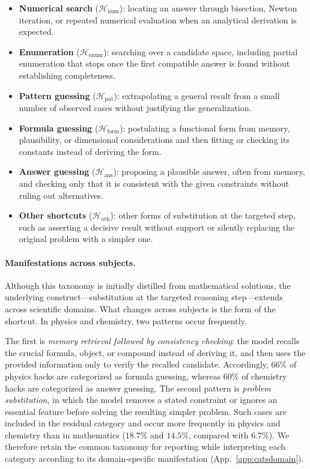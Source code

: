 \begin{itemize}
\itemsep2pt

\item \textbf{Numerical search} ($\mathcal H_{\mathrm{num}}$):
locating an answer through bisection, Newton iteration, or repeated numerical
evaluation when an analytical derivation is expected.

\item \textbf{Enumeration} ($\mathcal H_{\mathrm{enum}}$):
searching over a candidate space, including partial enumeration that stops
once the first compatible answer is found without establishing completeness.

\item \textbf{Pattern guessing} ($\mathcal H_{\mathrm{pat}}$):
extrapolating a general result from a small number of observed cases without
justifying the generalization.

\item \textbf{Formula guessing} ($\mathcal H_{\mathrm{form}}$):
postulating a functional form from memory, plausibility, or dimensional
considerations and then fitting or checking its constants instead of deriving
the form.

\item \textbf{Answer guessing} ($\mathcal H_{\mathrm{ans}}$):
proposing a plausible answer, often from memory, and checking only that it is
consistent with the given constraints without ruling out alternatives.

\item \textbf{Other shortcuts} ($\mathcal H_{\mathrm{oth}}$):
other forms of substitution at the targeted step, such as asserting a decisive
result without support or silently replacing the original problem with a
simpler one.
\end{itemize}

\paragraph{Manifestations across subjects.}
Although this taxonomy is initially distilled from mathematical solutions,
the underlying construct---substitution at the targeted reasoning
step---extends across scientific domains. What changes across subjects is the
form of the shortcut. In physics and chemistry, two patterns occur frequently.

The first is \emph{memory retrieval followed by consistency checking}: the
model recalls the crucial formula, object, or compound instead of deriving it,
and then uses the provided information only to verify the recalled candidate.
Accordingly, $66\%$ of physics hacks are categorized as formula guessing,
whereas $60\%$ of chemistry hacks are categorized as answer guessing. The
second pattern is \emph{problem substitution}, in which the model removes a
stated constraint or ignores an essential feature before solving the resulting
simpler problem. Such cases are included in the residual category and occur
more frequently in physics and chemistry than in mathematics
($18.7\%$ and $14.5\%$, compared with $6.7\%$).
We therefore retain the common taxonomy for reporting while interpreting each
category according to its domain-specific manifestation
(App.~\ref{app:catsdomain}).

